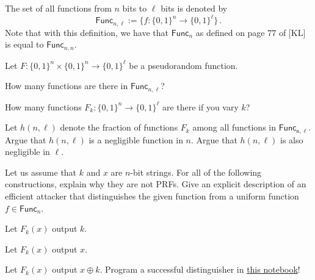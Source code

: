 \documentclass[a4paper,10pt,landscape,twocolumn]{scrartcl}
\begin{document}
\problems


\begin{exercise}
The set of all functions from $n$ bits to $\ell$ bits is denoted by
\[ \mathsf{Func}_{n,\ell} := \big\{f:\{0,1\}^n \rightarrow \{0,1\}^{\ell} \big\} \, .
\]
Note that with this definition, we have that $\mathsf{Func}_n$ as defined on page 77 of [KL] is equal to $\mathsf{Func}_{n,n}$.

Let $F:\{0,1\}^n \times \{0,1\}^n \rightarrow \{0,1\}^\ell$ be a pseudorandom function.

\begin{subex}
How many functions are there in $\mathsf{Func}_{n,\ell}$?
\end{subex}

\begin{subex}
How many functions $F_k:\{0,1\}^n \rightarrow \{0,1\}^\ell$ are there if you vary $k$?
\end{subex}

\begin{subex}
Let $h(n,\ell)$ denote the fraction of functions $F_k$ among all functions in $\mathsf{Func_{n,\ell}}$. Argue that $h(n, \ell)$ is a negligible function in $n$. Argue that $h(n,\ell)$ is also negligible in $\ell$.
\end{subex}

\end{exercise}


\begin{exercise}
Let us assume that $k$ and $x$ are $n$-bit strings. For all of the following constructions, explain why they are not PRFs. Give an explicit description of an efficient attacker that distinguishes the given function from a uniform function $f \in \mathsf{Func}_n$.

\begin{subex}
Let $F_k(x)$ output $k$.
\end{subex}

\begin{subex}
Let $F_k(x)$ output $x$.
\end{subex}

\begin{subex}
Let $F_k(x)$ output $x \oplus k$. Program a successful distinguisher in \href{https://colab.research.google.com/drive/1uCr-BvOARnlc3qAp2nam2FlxpQBUVMgS}{this notebook}!
\end{subex}

\end{exercise}
\end{document}
